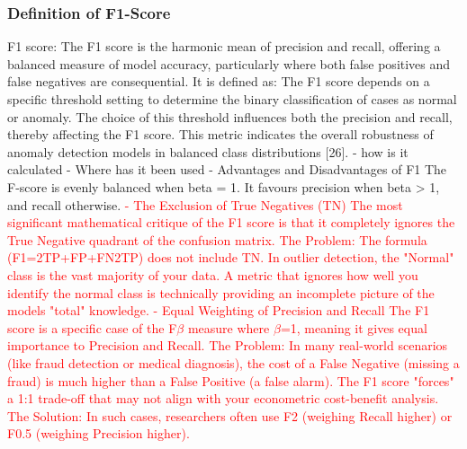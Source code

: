 \subsubsection{Definition of F1-Score}
F1 score: The F1 score is the harmonic mean of
precision and recall, offering a balanced measure of model
accuracy, particularly where both false positives and false
negatives are consequential. It is defined as:
The F1 score depends on a specific threshold setting to
determine the binary classification of cases as normal or
anomaly. The choice of this threshold influences both the
precision and recall, thereby affecting the F1 score. This metric
indicates the overall robustness of anomaly detection models
in balanced class distributions [26].
    - how is it calculated
    - Where has it been used
    - Advantages and Disadvantages of F1
The F-score is evenly balanced when beta = 1. It favours precision when beta > 1,
and recall otherwise.
\textcolor{red}{
    -   The Exclusion of True Negatives (TN)
    The most significant mathematical critique of the F1 score is that it completely ignores the True Negative quadrant of the confusion matrix.
    The Problem: The formula (F1=2TP+FP+FN2TP) does not include TN. In outlier detection, the "Normal" class is the vast majority of your data.
    A metric that ignores how well you identify the normal class is technically providing an incomplete picture of the models "total" knowledge.
    -   Equal Weighting of Precision and Recall
    The F1 score is a specific case of the F$\beta$ measure where $\beta$=1, meaning it gives equal importance to Precision and Recall.
    The Problem: In many real-world scenarios (like fraud detection or medical diagnosis), the cost of a False Negative (missing a fraud) is much higher than a False Positive (a false alarm). 
    The F1 score "forces" a 1:1 trade-off that may not align with your econometric cost-benefit analysis.
    The Solution: In such cases, researchers often use F2 (weighing Recall higher) or F0.5 (weighing Precision higher).}
